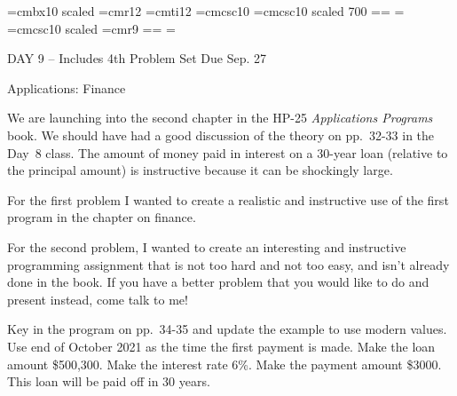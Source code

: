 
\def\folio{\ifnum\pageno>0 \number\pageno \else
   \ifnum\pageno<0 \romannumeral-\pageno \else\fi\fi}

\font\largebf=cmbx10  scaled 
\font\largerm=cmr12
\font\largeit=cmti12
\font\tensc=cmcsc10
\font\sevensc=cmcsc10 scaled 700
\newfam\scfam \def\sc{\fam\scfam\tensc}
\textfont\scfam=\tensc \scriptfont\scfam=\sevensc
\scriptscriptfont\scfam=\sevensc
\font\largesc=cmcsc10 scaled 
\font\ninerm=cmr9
\newfam\srfam \def\sr{\fam\srfam\ninerm}
\textfont\srfam=\ninerm \scriptfont\srfam=\sevenrm
\scriptscriptfont\srfam=\fiverm




\null\vskip36pt

\centerline{\largerm DAY 9 -- Includes 4th Problem Set Due Sep. 27}
\nobreak\bigskip

\centerline{\largeit Applications: Finance}
\nobreak\bigskip

\nobreak\bigskip

\noindent  We are launching into the second chapter in the HP-25 {\it Applications Programs} book. We should have had a good discussion of the theory on pp.~32-33 in the Day~8 class. The amount of money paid in interest on a 30-year loan (relative to the principal amount) is instructive because it can be shockingly large.

\bigskip

\nobreak\bigskip

\noindent For the first problem I wanted to create a realistic and instructive use of the first program in the chapter on finance.

For the second problem, I wanted to create an interesting and instructive programming assignment that is not too hard and not too easy, and isn't already done in the book. If you have a better problem that you would like to do and present instead, come talk to me!

\bigskip


\bigskip

\noindent Key in the program on pp.~34-35 and update the example to use modern values. Use end of October 2021 as the time the first payment is made. Make the loan amount \$500,300. Make the interest rate 6\%. Make the payment amount \$3000. This loan will be paid off in 30 years.

